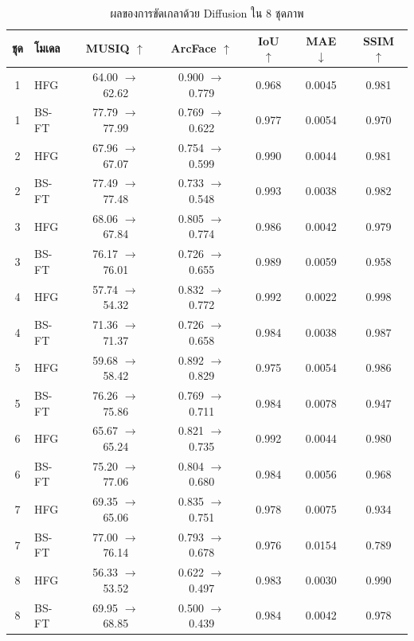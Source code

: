\begin{table}[!htbp]
\centering
\caption{ผลของการขัดเกลาด้วย Diffusion ใน 8 ชุดภาพ}
\label{tab:diff_result}
\footnotesize
\begin{tabular}{|c|l|c|c|c|c|c|}
\hline
\textbf{ชุด} & \textbf{โมเดล} & \textbf{MUSIQ} $\uparrow$ & \textbf{ArcFace} $\uparrow$ & \textbf{IoU} $\uparrow$ & \textbf{MAE} $\downarrow$ & \textbf{SSIM} $\uparrow$ \\ \hline
1 & HFG & 64.00 $\rightarrow$ 62.62 & 0.900 $\rightarrow$ 0.779 & 0.968 & 0.0045 & 0.981 \\ \hline
1 & BS-FT & 77.79 $\rightarrow$ 77.99 & 0.769 $\rightarrow$ 0.622 & 0.977 & 0.0054 & 0.970 \\ \hline
2 & HFG & 67.96 $\rightarrow$ 67.07 & 0.754 $\rightarrow$ 0.599 & 0.990 & 0.0044 & 0.981 \\ \hline
2 & BS-FT & 77.49 $\rightarrow$ 77.48 & 0.733 $\rightarrow$ 0.548 & 0.993 & 0.0038 & 0.982 \\ \hline
3 & HFG & 68.06 $\rightarrow$ 67.84 & 0.805 $\rightarrow$ 0.774 & 0.986 & 0.0042 & 0.979 \\ \hline
3 & BS-FT & 76.17 $\rightarrow$ 76.01 & 0.726 $\rightarrow$ 0.655 & 0.989 & 0.0059 & 0.958 \\ \hline
4 & HFG & 57.74 $\rightarrow$ 54.32 & 0.832 $\rightarrow$ 0.772 & 0.992 & 0.0022 & 0.998 \\ \hline
4 & BS-FT & 71.36 $\rightarrow$ 71.37 & 0.726 $\rightarrow$ 0.658 & 0.984 & 0.0038 & 0.987 \\ \hline
5 & HFG & 59.68 $\rightarrow$ 58.42 & 0.892 $\rightarrow$ 0.829 & 0.975 & 0.0054 & 0.986 \\ \hline
5 & BS-FT & 76.26 $\rightarrow$ 75.86 & 0.769 $\rightarrow$ 0.711 & 0.984 & 0.0078 & 0.947 \\ \hline
6 & HFG & 65.67 $\rightarrow$ 65.24 & 0.821 $\rightarrow$ 0.735 & 0.992 & 0.0044 & 0.980 \\ \hline
6 & BS-FT & 75.20 $\rightarrow$ 77.06 & 0.804 $\rightarrow$ 0.680 & 0.984 & 0.0056 & 0.968 \\ \hline
7 & HFG & 69.35 $\rightarrow$ 65.06 & 0.835 $\rightarrow$ 0.751 & 0.978 & 0.0075 & 0.934 \\ \hline
7 & BS-FT & 77.00 $\rightarrow$ 76.14 & 0.793 $\rightarrow$ 0.678 & 0.976 & 0.0154 & 0.789 \\ \hline
8 & HFG & 56.33 $\rightarrow$ 53.52 & 0.622 $\rightarrow$ 0.497 & 0.983 & 0.0030 & 0.990 \\ \hline
8 & BS-FT & 69.95 $\rightarrow$ 68.85 & 0.500 $\rightarrow$ 0.439 & 0.984 & 0.0042 & 0.978 \\ \hline

\end{tabular}
\end{table}
